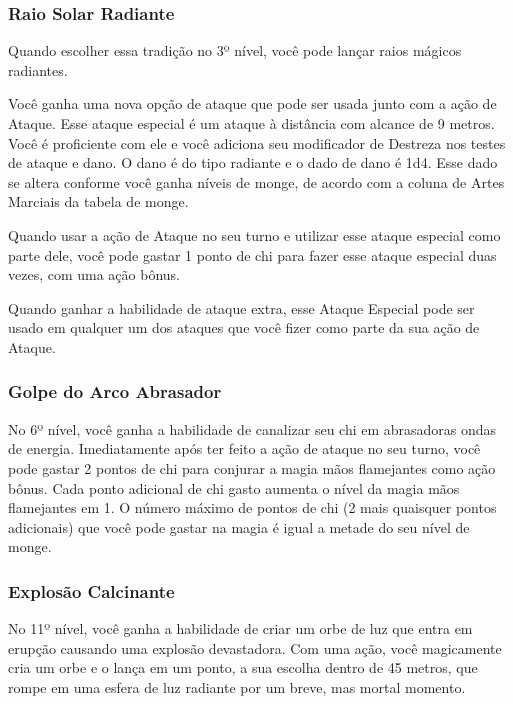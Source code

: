 \begin{multicols}{2}
\subsubsection{Raio Solar Radiante}%
\label{ssub:raio_solar_radiante}

Quando escolher essa tradição no 3º nível, você pode lançar raios mágicos
radiantes.

Você ganha uma nova opção de ataque que pode ser usada junto com a ação de
Ataque. Esse ataque especial é um ataque à distância com alcance de 9 metros.
Você é proficiente com ele e você adiciona seu modificador de Destreza nos
testes de ataque e dano. O dano é do tipo radiante e o dado de dano é 1d4. Esse
dado se altera conforme você ganha níveis de monge, de acordo com a coluna de
Artes Marciais da tabela de monge.

Quando usar a ação de Ataque no seu turno e utilizar esse ataque especial como
parte dele, você pode gastar 1 ponto de chi para fazer esse ataque especial duas
vezes, com uma ação bônus.

Quando ganhar a habilidade de ataque extra, esse Ataque Especial pode ser usado
em qualquer um dos ataques que você fizer como parte da sua ação de Ataque.

\subsubsection*{Golpe do Arco Abrasador}%
\label{ssub:golpe_do_arco_abrasador}

No 6º nível, você ganha a habilidade de canalizar seu chi em abrasadoras ondas
de energia. Imediatamente após ter feito a ação de ataque no seu turno, você
pode gastar 2 pontos de chi para conjurar a magia mãos flamejantes como ação
bônus. Cada ponto adicional de chi gasto aumenta o nível da magia mãos
flamejantes em 1. O número máximo de pontos de chi (2 mais quaisquer pontos
adicionais) que você pode gastar na magia é igual a metade do seu nível de
monge.

\subsubsection{Explosão Calcinante}%
\label{ssub:explosao_calcinante}

No 11º nível, você ganha a habilidade de criar um orbe de luz que entra em
erupção causando uma explosão devastadora. Com uma ação, você magicamente cria
um orbe e o lança em um ponto, a sua escolha dentro de 45 metros, que rompe em
uma esfera de luz radiante por um breve, mas mortal momento.


\end{multicols}
